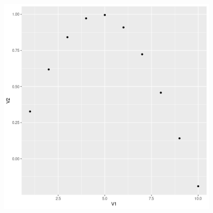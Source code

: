 \documentclass[lualatex,a4paper,12pt,report,ja=standard]{bxjsarticle}
\begin{document}
\begin{center}
\includegraphics[width=0.8\textwidth]{figure/sin_ggplot2.png}
\end{center}
\end{document}
